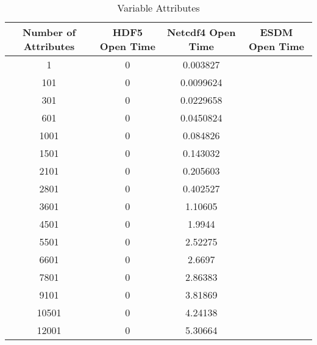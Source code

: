 \begin{table}[H]
\centering
\begin{tabular}{|c|c|c|c|}
\hline
Number of Attributes  & HDF5 Open Time & Netcdf4 Open Time & ESDM Open Time \\ \hline \hline
1 & 0 & 0.003827 & \\ \hline
101 & 0 & 0.0099624 & \\ \hline
301 & 0 & 0.0229658 & \\ \hline
601 & 0 & 0.0450824 & \\ \hline
1001 & 0 & 0.084826 & \\ \hline
1501 & 0 & 0.143032 & \\ \hline
2101 & 0 & 0.205603 & \\ \hline
2801 & 0 & 0.402527 & \\ \hline
3601 & 0 & 1.10605 & \\ \hline
4501 & 0 & 1.9944 & \\ \hline
5501 & 0 & 2.52275 & \\ \hline
6601 & 0 & 2.6697 & \\ \hline
7801 & 0 & 2.86383 & \\ \hline
9101 & 0 & 3.81869 & \\ \hline
10501 & 0 & 4.24138 & \\ \hline
12001 & 0 & 5.30664 & \\ \hline

\hline
\end{tabular}
\caption{\label{tab:variable_atts} Variable Attributes}
\end{table}
